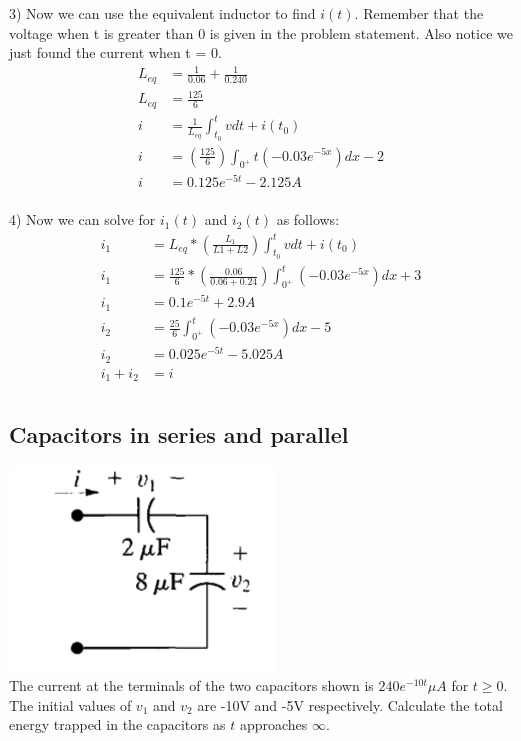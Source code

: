 3) Now we can use the equivalent inductor to find $i(t)$. Remember that the
voltage when t is greater than 0 is given in the problem statement. Also 
notice we just found the current when t = 0.   \\

\begin{align*}
	L_{eq} &= \frac{1}{0.06} + \frac{1}{0.240} \\
	L_{eq} &= \frac{125}{6} \\
	i &= \frac{1}{L_{eq}}\int_{t_0}^{t} v dt + i(t_0) \\
	i &= \left( \frac{125}{6}\right)\int_{0^{+}}{t} (-0.03e^{-5x})dx - 2 \\
	i &= 0.125e^{-5t} - 2.125 A \\
\end{align*}

4) Now we can solve for $i_1(t)$ and $i_2(t)$ as follows: \\
\begin{align*}
	i_1 &= L_{eq} * \left( \frac{L_1}{L1+L2} \right) \int_{t_0}^{t} v dt + i (t_0) \\
	i_1 &= \frac{125}{6} * \left(\frac{0.06}{0.06 + 0.24}\right) \int_{0^{+}}^{t} (-0.03e^{-5x})dx + 3 \\
	i_1 &= 0.1e^{-5t} + 2.9 A \\ 
	i_2 &= \frac{25}{6} \int_{0^{+}}^{t} (-0.03e^{-5x})dx - 5 \\
	i_2 &= 0.025e^{-5t} - 5.025 A \\
	i_1 + i_2 &= i \\
\end{align*}


\subsection{Capacitors in series and parallel}
\includegraphics[scale=0.5]{img/c6/p2} \\
The current at the terminals of the two capacitors shown is $240e^{-10t} \mu A$ for $t \geq 0$. The
initial values of $v_1$ and $v_2$ are -10V and -5V respectively. Calculate the total energy trapped
in the capacitors as $t$ approaches $\infty$. 

